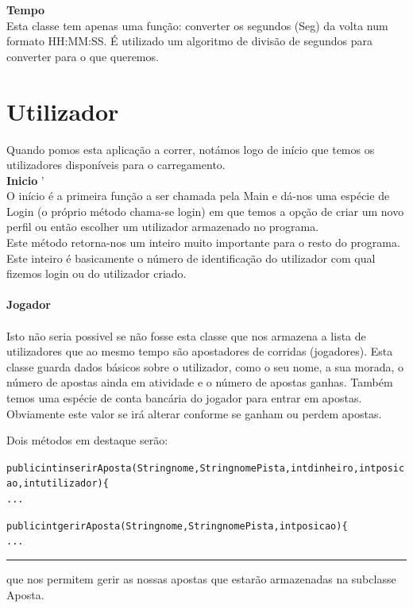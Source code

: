 \documentclass[10pt]{article}
\newenvironment{code}                    
{\textbf{
} \hspace{1cm} \hrulefill \\ 
\smallskip 
\begin{center}
\begin{minipage}{0.9\textwidth} 
\begin{alltt}\small}
{\end{alltt}
\end{minipage}
\end{center}
\hrule\smallskip
}
\begin{document}
\textbf{Tempo}
\\
Esta classe tem apenas uma função: converter os segundos (Seg) da volta num formato HH:MM:SS.
É utilizado um algoritmo de divisão de segundos para converter para o que queremos.

\pagebreak

\section{Utilizador\\}

Quando pomos esta aplicação a correr, notámos logo de início que temos os utilizadores disponíveis para o carregamento.
\\

\textbf{Inicio}
'
\\
O início é a primeira função a ser chamada pela Main e dá-nos uma espécie de Login (o próprio método chama-se login) em que temos a opção de criar um novo perfil ou então escolher um utilizador armazenado no programa.
\\
Este método retorna-nos um inteiro muito importante para o resto do programa. Este inteiro é basicamente o número de identificação do utilizador com qual fizemos login ou do utilizador criado.
\\ 
\\
\textbf{Jogador}
\\
\\
Isto não seria possivel se não fosse esta classe que nos armazena a lista de utilizadores que ao mesmo tempo são apostadores de corridas (jogadores).
Esta classe guarda dados básicos sobre o utilizador, como o seu nome, a sua morada, o número de apostas ainda em atividade e o número de apostas ganhas.
Também temos uma espécie de conta bancária do jogador para entrar em apostas. Obviamente este valor se irá alterar conforme se ganham ou perdem apostas.

Dois métodos em destaque serão:
\begin{code} 
public int inserirAposta (String nome, String nomePista, int dinheiro, int posicao, int utilizador)\{
...

public int gerirAposta (String nome, String nomePista, int posicao)\{
...


\end{code}
que nos permitem gerir as nossas apostas que estarão armazenadas na subclasse Aposta.
\\
\\
\end{document}
